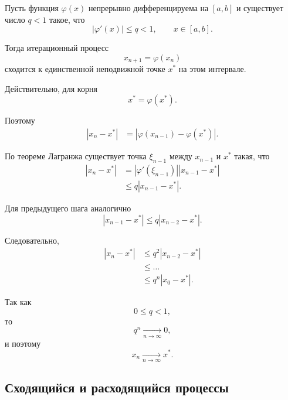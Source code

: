 \documentclass[../final.tex]{subfiles}
\begin{document}
Пусть функция $\varphi(x)$ непрерывно дифференцируема на $[a,b]$ и
существует число $q<1$ такое, что
%
\begin{equation*}
    |\varphi'(x)|\leq q<1,
    \qquad
    x\in[a,b].
\end{equation*}

Тогда итерационный процесс
%
\begin{equation*}
    x_{n+1}=\varphi(x_n)
\end{equation*}
%
сходится к единственной неподвижной точке $x^*$ на этом интервале.

Действительно, для корня
%
\begin{equation*}
    x^*=\varphi(x^*).
\end{equation*}

Поэтому
%
\begin{align*}
    |x_n-x^*|
    &=
    |\varphi(x_{n-1})-\varphi(x^*)|.
\end{align*}

По теореме Лагранжа существует точка $\xi_{n-1}$ между
$x_{n-1}$ и $x^*$ такая, что
%
\begin{align*}
    |x_n-x^*|
    &=
    |\varphi'(\xi_{n-1})|
    |x_{n-1}-x^*|
    \\
    &\leq
    q|x_{n-1}-x^*|.
\end{align*}

Для предыдущего шага аналогично
%
\begin{equation*}
    |x_{n-1}-x^*|
    \leq
    q|x_{n-2}-x^*|.
\end{equation*}

Следовательно,
%
\begin{align*}
    |x_n-x^*|
    &\leq
    q^2|x_{n-2}-x^*|
    \\
    &\leq
    \ldots
    \\
    &\leq
    q^n|x_0-x^*|.
\end{align*}

Так как
%
\begin{equation*}
    0\leq q<1,
\end{equation*}
%
то
%
\begin{equation*}
    q^n\underset{n\to\infty}{\longrightarrow}0,
\end{equation*}
%
и поэтому
%
\begin{equation*}
    x_n\underset{n\to\infty}{\longrightarrow}x^*.
\end{equation*}


\subsection{Сходящийся и расходящийся процессы}
\end{document}
